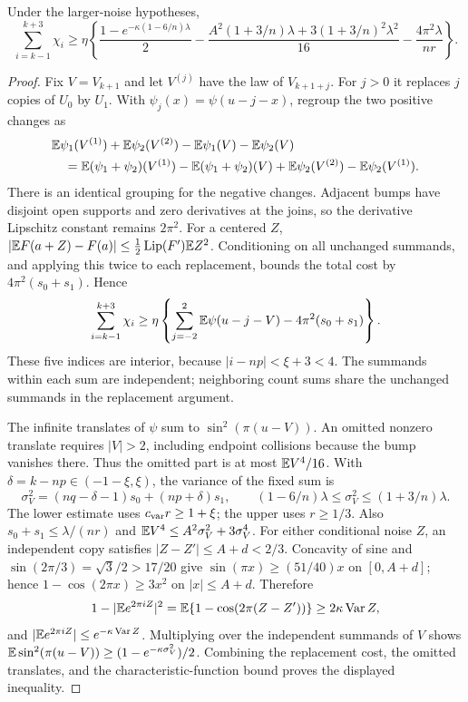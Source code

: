 \begin{lemma}
\label{short:count:five-loss-lemma}
Under the larger-noise hypotheses,
\begin{equation}\label{short:count:reserve}
 \sum_{i=k-1}^{k+3}\chi_i\ge\eta\left\{
 \frac{1-e^{-\kappa(1-6/n)\lambda}}2
 -\frac{A^2(1+3/n)\lambda+3(1+3/n)^2\lambda^2}{16}
 -\frac{4\pi^2\lambda}{nr}\right\}.
\end{equation}
\end{lemma}
\begin{proof}
Fix $V=V_{k+1}$ and let $V^{(j)}$ have the law of $V_{k+1+j}$.
For $j>0$ it replaces $j$ copies of $U_0$ by $U_1$. With
$\psi_j(x)=\psi(u-j-x)$, regroup the two positive changes as
\begin{align*}
 &\mathbb E \psi_1(V^{(1)})+\mathbb E \psi_2(V^{(2)})-\mathbb E \psi_1(V)-\mathbb E \psi_2(V)\\
 &\quad=\mathbb E(\psi_1+\psi_2)(V^{(1)})-\mathbb E(\psi_1+\psi_2)(V)
                       +\mathbb E \psi_2(V^{(2)})-\mathbb E \psi_2(V^{(1)}).
\end{align*}
There is an identical grouping for the negative changes.
Adjacent bumps have disjoint open supports and zero derivatives at the
joins, so the derivative Lipschitz constant remains $2\pi^2$.
For a centered $Z$,
$|\mathbb E F(a+Z)-F(a)|\le\tfrac12\operatorname{Lip}(F')\mathbb E Z^2$.
Conditioning on all unchanged summands, and applying this twice to each
replacement, bounds the total cost by $4\pi^2(s_0+s_1)$. Hence
\[
 \sum_{i=k-1}^{k+3}\chi_i
 \ge\eta\left\{\sum_{j=-2}^2\mathbb E \psi(u-j-V)-4\pi^2(s_0+s_1)\right\}.
\]
These five indices are interior, because $|i-np|<\xi+3<4$.
The summands within each sum are independent; neighboring count sums
share the unchanged summands in the replacement argument.

The infinite translates of $\psi$ sum to $\sin^2(\pi(u-V))$.
An omitted nonzero translate requires $|V|>2$, including endpoint
collisions because the bump vanishes there. Thus the omitted part is at
most $\mathbb E V^4/16$. With $\delta=k-np\in(-1-\xi,\xi)$, the variance of the fixed sum is
\[
 \sigma_V^2=(nq-\delta-1)s_0+(np+\delta)s_1,
 \qquad(1-6/n)\lambda\le\sigma_V^2\le(1+3/n)\lambda.
\]
The lower estimate uses $c_{\rm var} r\ge1+\xi$; the upper uses $r\ge1/3$.
Also $s_0+s_1\le\lambda/(nr)$ and $\mathbb E V^4\le A^2\sigma_V^2+3\sigma_V^4$.
For either conditional noise $Z$, an independent copy satisfies
$|Z-Z'|\le A+d<2/3$. Concavity of sine and
$\sin(2\pi/3)=\sqrt3/2>17/20$ give
$\sin(\pi x)\ge(51/40)x$ on $[0,A+d]$; hence
$1-\cos(2\pi x)\ge3x^2$ on $|x|\le A+d$.
Therefore
\[
 1-|\mathbb E e^{2\pi iZ}|^2
 =\mathbb E\{1-\cos(2\pi(Z-Z'))\}\ge2\kappa\operatorname{Var} Z,
\]
and $|\mathbb E e^{2\pi iZ}|\le e^{-\kappa\operatorname{Var} Z}$.
Multiplying over the independent summands of $V$ shows
$\mathbb E\sin^2(\pi(u-V))\ge(1-e^{-\kappa\sigma_V^2})/2$.
Combining the replacement cost, the omitted translates, and the
characteristic-function bound proves the displayed inequality.
\end{proof}

